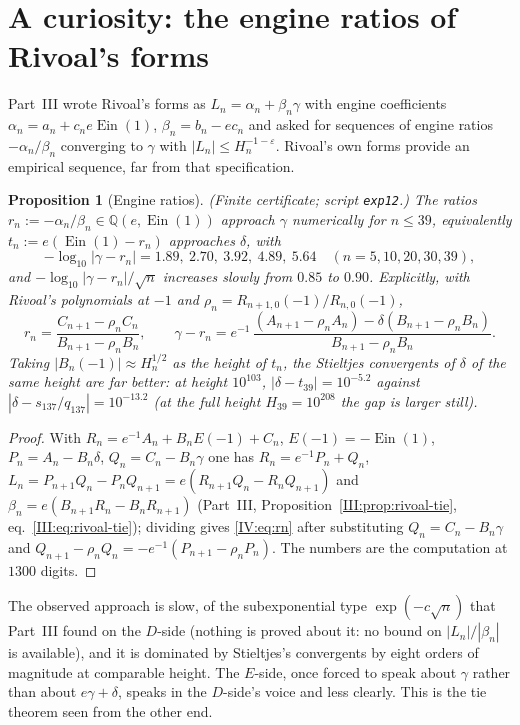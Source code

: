 \documentclass[11pt,a4paper]{article}
\newcommand{\Q}{\mathbb Q}
\newcommand{\Ein}{\operatorname{Ein}}
\newtheorem{proposition}[theorem]{Proposition}
\theoremstyle{definition}
\theoremstyle{remark}
\numberwithin{equation}{section}
\begin{document}
\section{A curiosity: the engine ratios of Rivoal's forms}\label{IV:sec:ratios}

Part~III wrote Rivoal's forms as $L_n=\alpha_n+\beta_n\gamma$ with engine coefficients
$\alpha_n=a_n+c_ne\Ein(1)$, $\beta_n=b_n-ec_n$ and asked for sequences of engine ratios
$-\alpha_n/\beta_n$ converging to $\gamma$ with $|L_n|\le H_n^{-1-\varepsilon}$. Rivoal's own
forms provide an empirical sequence, far from that specification.

\begin{proposition}[Engine ratios]\label{IV:prop:ratios}
\textup{(Finite certificate; script \texttt{exp12}.)} The ratios
$r_n:=-\alpha_n/\beta_n\in\Q(e,\Ein(1))$ approach $\gamma$ numerically for $n\le39$,
equivalently $t_n:=e(\Ein(1)-r_n)$ approaches $\delta$, with
\[
 -\log_{10}|\gamma-r_n|=1.89,\ 2.70,\ 3.92,\ 4.89,\ 5.64\quad(n=5,10,20,30,39),
\]
and $-\log_{10}|\gamma-r_n|/\sqrt n$ increases slowly from $0.85$ to $0.90$.
Explicitly, with Rivoal's polynomials at $-1$ and $\rho_n=R_{n+1,0}(-1)/R_{n,0}(-1)$,
\begin{equation}\label{IV:eq:rn}
 r_n=\frac{C_{n+1}-\rho_nC_n}{B_{n+1}-\rho_nB_n},\qquad
 \gamma-r_n=e^{-1}\,\frac{(A_{n+1}-\rho_nA_n)-\delta(B_{n+1}-\rho_nB_n)}{B_{n+1}-\rho_nB_n}.
\end{equation}
Taking $|B_n(-1)|\approx H_n^{1/2}$ as the height of $t_n$, the Stieltjes convergents of
$\delta$ of the same height are far better: at height $10^{103}$, $|\delta-t_{39}|=10^{-5.2}$
against $|\delta-s_{137}/q_{137}|=10^{-13.2}$ (at the full height $H_{39}=10^{208}$ the gap
is larger still).
\end{proposition}
\begin{proof}
With $R_n=e^{-1}A_n+B_nE(-1)+C_n$, $E(-1)=-\Ein(1)$, $P_n=A_n-B_n\delta$, $Q_n=C_n-B_n\gamma$
one has $R_n=e^{-1}P_n+Q_n$, $L_n=P_{n+1}Q_n-P_nQ_{n+1}=e(R_{n+1}Q_n-R_nQ_{n+1})$ and
$\beta_n=e(B_{n+1}R_n-B_nR_{n+1})$ (Part~III, Proposition~\ref{III:prop:rivoal-tie}, eq.~\eqref{III:eq:rivoal-tie}); dividing gives \eqref{IV:eq:rn}
after substituting $Q_n=C_n-B_n\gamma$ and $Q_{n+1}-\rho_nQ_n=-e^{-1}(P_{n+1}-\rho_nP_n)$.
The numbers are the computation at $1300$ digits.
\end{proof}

The observed approach is slow, of the subexponential type $\exp(-c\sqrt n)$ that Part~III
found on the $D$-side (nothing is proved about it: no bound on $|L_n|/|\beta_n|$ is
available), and it is dominated by Stieltjes's convergents by eight orders of magnitude at
comparable height. The $E$-side, once forced to speak about $\gamma$ rather than
about $e\gamma+\delta$, speaks in the $D$-side's voice and less clearly. This is the tie
theorem seen from the other end.
\end{document}
